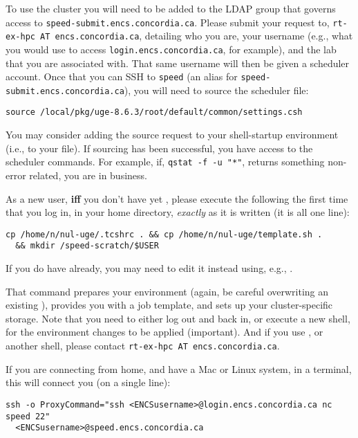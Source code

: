 \documentclass{easychair}
\begin{document}
To use the cluster you will need to be added to the LDAP group that governs 
access to \texttt{speed-submit.encs.concordia.ca}. Please submit your request 
to, \texttt{rt-ex-hpc AT encs.concordia.ca}, detailing who you are, your username 
(e.g., what you would use to access \texttt{login.encs.concordia.ca}, for 
example), and the lab that you are associated with. That same username will 
then be given a scheduler account. Once that you can SSH to \texttt{speed}
(an alias for \texttt{speed-submit.encs.concordia.ca}), you will
need to source the scheduler file:

\begin{verbatim}
source /local/pkg/uge-8.6.3/root/default/common/settings.csh 
\end{verbatim}

You may consider adding the source request to your shell-startup environment
(i.e., to your  file). If sourcing has been successful, you have 
access to the scheduler commands. For example, if, \texttt{qstat -f -u "*"}, 
returns something non-error related, you are in business. 

As a new user, \textbf{iff} you don't have yet ,
please execute the following the first time that you log
in, in your home directory, \emph{exactly} as it is written (it is all one
line):

\begin{verbatim}
cp /home/n/nul-uge/.tcshrc . && cp /home/n/nul-uge/template.sh .
  && mkdir /speed-scratch/$USER
\end{verbatim}

If you do have  already, you may need to edit it instead
using, e.g., .

That command prepares your environment (again, be careful overwriting an existing
), provides you with a job template, and sets up your
cluster-specific storage. Note that you need to either log out and back
in, or execute a new shell, for the environment changes to be applied
(important). And if you use , or another shell, please contact 
\texttt{rt-ex-hpc AT encs.concordia.ca}.

If you are connecting from home, and have a Mac or Linux system, in a
terminal, this will connect you (on a single line):

\begin{verbatim}
ssh -o ProxyCommand="ssh <ENCSusername>@login.encs.concordia.ca nc speed 22"
  <ENCSusername>@speed.encs.concordia.ca
\end{verbatim}
\end{document}
